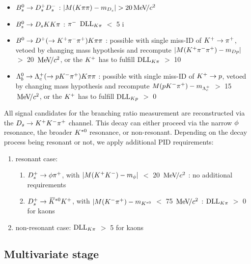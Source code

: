 \begin{itemize}

\item $\Bs\to\Dsp\Dsm$ : $|M(\kaon\pion\pion) - m_{\Ds}| > 20 \mevcc$ 

\item $\Bs\to\Ds\kaon\kaon\pion$ : $\pim$ $\dllkpi$ $<$ 5 
i
\item $\Bz\to\Dp(\to\Kp\pim\pip)\kaon\pion\pion$ : possible with single miss-ID of $\Kp\rightarrow\pip$, vetoed by changing mass hypothesis and recompute $|M(\Kp\pim\pip) - m_{Dp}|$ $>$ 20 $\mevcc$, 
or the $\Kp$ has to fulfill $\dllkpi$ $>$ 10

\item $\Lb\to\Lc(\to\proton\Km\pip)\kaon\pion\pion$ : possible with single miss-ID of $\Kp\rightarrow\proton$, vetoed by changing mass hypothesis and recompute $M(\proton\Km\pip) - m_{\Lc}$ $>$ 15 $\mevcc$, 
or the $\Kp$ has to fulfill $\mathrm{DLL}_{\kaon\proton}$ $>$ 0  

\end{itemize} 


All signal candidates for the branching ratio measurement are reconstructed via the $\Ds\to\Kp\Km\pip$ channel. This decay can either proceed via the narrow $\phiz$ resonance, the broader $\Kstarz$ resonance, or non-resonant.
Depending on the decay process being resonant or not, we apply additional PID requirements:

\begin{enumerate}

\item resonant case: 
\begin{enumerate}
\item $\Dsp\to\phiz\pip$, with $|M(\Kp\Km) - m_{\phiz}|$ $<$ 20 $\mevcc$ : no additional requirements
\item $\Dsp\to\Kstarzb\Kp$, with  $|M(\Km\pip) -m_{\Kstarz}$ $<$ 75 $\mevcc$ :  $\dllkpi$ $>$ 0 for kaons
\end{enumerate}

\item non-resonant case: $\dllkpi$ $>$ 5 for kaons

\end{enumerate}




\subsection{Multivariate stage}

